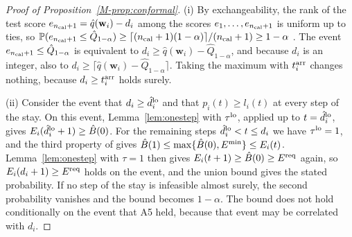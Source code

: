 \begin{proof}[Proof of Proposition~\ref{M-prop:conformal}]
(i) By exchangeability, the rank of the test score $e_{n_{\mathrm{cal}}+1}=\hat q(\mathbf w_i)-d_i$ among the scores $e_1,\dots,e_{n_{\mathrm{cal}}+1}$ is uniform up to ties, so $\mathbb P(e_{n_{\mathrm{cal}}+1}\le\hat Q_{1-\alpha})\ge\lceil(n_{\mathrm{cal}}+1)(1-\alpha)\rceil/(n_{\mathrm{cal}}+1)\ge1-\alpha$ \cite{vovk2022algorithmic,lei2018distributionfree}.
The event $e_{n_{\mathrm{cal}}+1}\le\hat Q_{1-\alpha}$ is equivalent to $d_i\ge\hat q(\mathbf w_i)-\hat Q_{1-\alpha}$, and because $d_i$ is an integer, also to $d_i\ge\lceil\hat q(\mathbf w_i)-\hat Q_{1-\alpha}\rceil$.
Taking the maximum with $t_i^{\mathrm{arr}}$ changes nothing, because $d_i\ge t_i^{\mathrm{arr}}$ holds surely.

(ii) Consider the event that $d_i\ge\hat d_i^{\mathrm{lo}}$ and that $p_i(t)\ge l_i(t)$ at every step of the stay.
On this event, Lemma~\ref{lem:onestep} with $\tau^{\mathrm{lo}}$, applied up to $t=\hat d_i^{\mathrm{lo}}$, gives $E_i(\hat d_i^{\mathrm{lo}}+1)\ge\hat B(0)$.
For the remaining steps $\hat d_i^{\mathrm{lo}}<t\le d_i$ we have $\tau^{\mathrm{lo}}=1$, and the third property of  gives $\hat B(1)\le\max\{\hat B(0),E^{\min}\}\le E_i(t)$.
Lemma~\ref{lem:onestep} with $\tau=1$ then gives $E_i(t+1)\ge\hat B(0)\ge E^{\mathrm{req}}$ again, so $E_i(d_i+1)\ge E^{\mathrm{req}}$ holds on the event, and the union bound gives the stated probability.
If no step of the stay is infeasible almost surely, the second probability vanishes and the bound becomes $1-\alpha$.
The bound does not hold conditionally on the event that A5 held, because that event may be correlated with $d_i$.
\end{proof}
